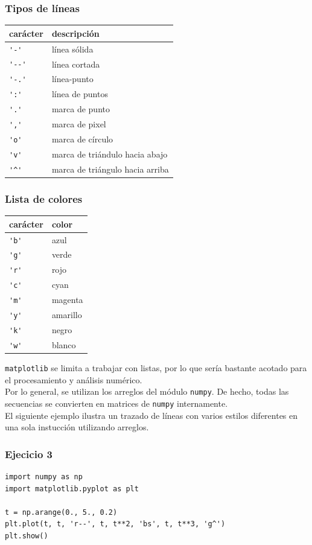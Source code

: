 \begin{frame}[fragile]
\frametitle{Tipos de líneas}
\begin{tabular}{l | l}
carácter & descripción \\ \hline
\verb|'-'|	& línea sólida \\ \hline
\verb|'--'| & línea cortada \\ \hline
\verb|'-.'| & línea-punto \\ \hline
\verb|':'|	& línea de puntos \\ \hline
\verb|'.'|	& marca de punto \\ \hline
\verb|','|	& marca de pixel \\ \hline
\verb|'o'|	& marca de círculo \\ \hline
\verb|'v'|	& marca de triándulo hacia abajo \\ \hline
\verb|'^'|	& marca de triángulo hacia arriba
\end{tabular}
\end{frame}
\begin{frame}[fragile]
\frametitle{Lista de colores}
\begin{tabular}{l | l}
carácter & color \\ \hline
\verb|'b'| & azul \\ \hline
\verb|'g'| & verde \\ \hline
\verb|'r'| & rojo \\ \hline
\verb|'c'| & cyan \\ \hline
\verb|'m'| & magenta \\ \hline
\verb|'y'| & amarillo \\ \hline
\verb|'k'| & negro \\ \hline
\verb|'w'| & blanco
\end{tabular}
\end{frame}
\begin{frame}
\texttt{matplotlib} se limita a trabajar con listas, por lo que sería bastante acotado para el procesamiento y análisis numérico.
\\
\medskip
Por lo general, se utilizan los arreglos del módulo \texttt{numpy}. De hecho, todas las secuencias se convierten en matrices de \texttt{numpy} internamente.
\\
\medskip
El siguiente ejemplo ilustra un trazado de líneas con varios estilos diferentes en una sola instucción utilizando arreglos.
\end{frame}
\begin{frame}[fragile]
\frametitle{Ejecicio 3}
\begin{lstlisting}
import numpy as np
import matplotlib.pyplot as plt

t = np.arange(0., 5., 0.2)
plt.plot(t, t, 'r--', t, t**2, 'bs', t, t**3, 'g^')
plt.show()
\end{lstlisting}
\end{frame}
